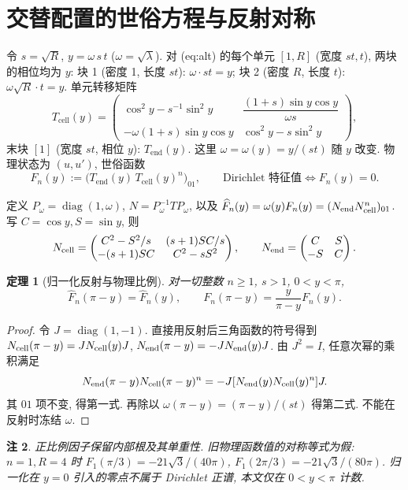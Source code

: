 \documentclass[UTF8]{ctexart}
\newtheorem{theorem}{定理}[section]
\newtheorem{remark}[theorem]{注}
\begin{document}
\section{交替配置的世俗方程与反射对称}

令 $s = \sqrt R$, $y = \omega\,s\,t$ ($\omega = \sqrt\lambda$).
对 (eq:alt) 的每个单元 $[1, R]$ (宽度 $st, t$), 两块的相位均为 $y$:
块 1 (密度 1, 长度 $st$): $\omega \cdot st = y$; 块 2 (密度 $R$, 长度
$t$): $\omega\sqrt R \cdot t = y$. 单元转移矩阵
\[
	T_{\mathrm{cell}}(y) =
	\begin{pmatrix}
		\cos^2 y - s^{-1}\sin^2 y & \dfrac{(1+s)\sin y\cos y}{\omega s}\\[2mm]
		-\omega(1+s)\sin y\cos y & \cos^2 y - s\sin^2 y
	\end{pmatrix},
\]
末块 $[1]$ (宽度 $st$, 相位 $y$): $T_{\mathrm{end}}(y)$.
这里 $\omega=\omega(y)=y/(st)$ 随 $y$ 改变. 物理状态为 $(u,u')$,
世俗函数
\begin{equation}
	F_n(y) := \bigl(T_{\mathrm{end}}(y)\,T_{\mathrm{cell}}(y)^n\bigr)_{01},
	\qquad \text{Dirichlet 特征值} \iff F_n(y) = 0.
\end{equation}

定义 $P_\omega=\operatorname{diag}(1,\omega)$,
$N=P_\omega^{-1}TP_\omega$, 以及
$\widehat F_n(y)=\omega(y)F_n(y)=(N_{\rm end}N_{\rm cell}^n)_{01}$.
写 $C=\cos y,S=\sin y$, 则
\[
 N_{\rm cell}=\begin{pmatrix}
 C^2-S^2/s &(s+1)SC/s\\ -(s+1)SC&C^2-sS^2
 \end{pmatrix},\qquad
 N_{\rm end}=\begin{pmatrix}C&S\\-S&C\end{pmatrix}.
\]
\begin{theorem}[归一化反射与物理比例]\label{thm:sym}
 对一切整数 $n\ge1$, $s>1$, $0<y<\pi$,
 \[
  \widehat F_n(\pi-y)=\widehat F_n(y),\qquad
  F_n(\pi-y)=\frac{y}{\pi-y}F_n(y).
 \]
\end{theorem}
\begin{proof}
 令 $J=\operatorname{diag}(1,-1)$. 直接用反射后三角函数的符号得到
 $N_{\rm cell}(\pi-y)=J N_{\rm cell}(y)J$,
 $N_{\rm end}(\pi-y)=-J N_{\rm end}(y)J$.
 由 $J^2=I$, 任意次幂的乘积满足
 \[
 N_{\rm end}(\pi-y)N_{\rm cell}(\pi-y)^n
 =-J[N_{\rm end}(y)N_{\rm cell}(y)^n]J.
 \]
 其 $01$ 项不变, 得第一式. 再除以 $\omega(\pi-y)=(\pi-y)/(st)$
 得第二式. 不能在反射时冻结 $\omega$.
\end{proof}
\begin{remark}
 正比例因子保留内部根及其单重性. 旧物理函数值的对称等式为假:
 $n=1,R=4$ 时
 $F_1(\pi/3)=-21\sqrt3/(40\pi)$,
 $F_1(2\pi/3)=-21\sqrt3/(80\pi)$.
 归一化在 $y=0$ 引入的零点不属于 Dirichlet 正谱, 本文仅在 $0<y<\pi$ 计数.
\end{remark}
\end{document}
